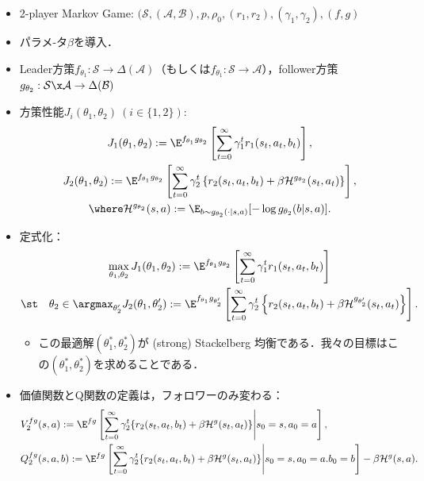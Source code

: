 \documentclass[a4paper,10pt,dvipdfmx]{jsarticle}
\begin{document}
\begin{itemize}
    \item 2-player Markov Game: $(\mathcal{S}, (\mathcal{A},\mathcal{B}), p, \rho_0, (r_1,r_2), (\gamma_1,\gamma_2),(f,g)$
    \item パラメ-タ$\beta$を導入．
    \item Leader方策$f_{\theta_1}:\mathcal{S}\to\Delta(\mathcal{A})$（もしくは$f_{\theta_1}:\mathcal{S}\to\mathcal{A}$），follower方策$g_{\theta_2}:\mathcal{S}\x\mathcal{A}\to\Delta(\mathcal{B})$
    \item 方策性能$J_i(\theta_1,\theta_2)~(i\in\{1,2\})$:
    \begin{gather}
        J_1(\theta_1,\theta_2):=\E^{f_{\theta_1}g_{\theta_2}}\left[\sum_{t=0}^\infty\gamma_1^tr_1(s_t,a_t,b_t)\right],\\
        J_2(\theta_1,\theta_2):=\E^{f_{\theta_1}g_{\theta_2}}\left[\sum_{t=0}^\infty \gamma_2^t\left\{r_2(s_t,a_t,b_t)+\beta\mathcal{H}^{g_{\theta_2}}(s_t,a_t)\right\}\right],\\
        \where \mathcal{H}^{g_{\theta_2}}(s,a):=\E_{b\sim g_{\theta_2}(\cdot|s,a)}[-\log g_{\theta_2}(b|s,a)].
    \end{gather}
    \item 定式化：
    \begin{subequations}
    \begin{gather}
        \max_{\theta_1,\theta_2} J_1(\theta_1,\theta_2):=\E^{f_{\theta_1}g_{\theta_2}}\left[\sum_{t=0}^\infty \gamma_1^tr_1(s_t,a_t,b_t)\right]\\
        \st\quad \theta_2\in\argmax_{\theta_2'} J_2(\theta_1,\theta_2'):=\E^{f_{\theta_1}g_{\theta_2'}}\left[\sum_{t=0}^\infty \gamma_2^t\left\{r_2(s_t,a_t,b_t)+\beta\mathcal{H}^{g_{\theta_2'}}(s_t,a_t)\right\}\right].
    \end{gather}\label{eq:formula_SSPG_qr_bbf}
    \end{subequations}
    \begin{itemize}
        \item この最適解$(\theta_1^*,\theta_2^*)$が (strong) Stackelberg 均衡である．我々の目標はこの$(\theta_1^*,\theta_2^*)$を求めることである．
    \end{itemize}
    \item 価値関数とQ関数の定義は，フォロワーのみ変わる：
    \begin{align}
        &V_2^{fg}(s,a):=\E^{fg}\left[\sum_{t=0}^\infty \gamma_2^t\{r_2(s_t,a_t,b_t)+\beta\mathcal{H}^g(s_t,a_t)\}\middle|s_0=s,a_0=a\right],\\
        &Q_2^{fg}(s,a,b):=\E^{fg}\left[\sum_{t=0}^\infty \gamma_2^t\{r_2(s_t,a_t,b_t)+\beta\mathcal{H}^g(s_t,a_t)\}\middle|s_0=s,a_0=a.b_0=b\right]-\beta\mathcal{H}^g(s,a).
    \end{align}


\end{itemize}
\end{document}
